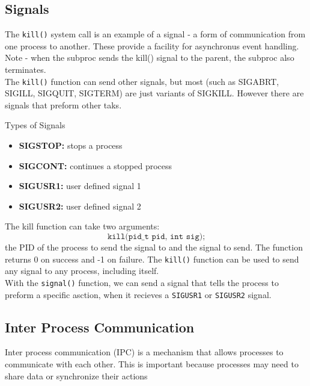 \documentclass[a4paper, 10pt]{article}
\begin{document}
\subsection{Signals}
The \texttt{kill()} system call is an example of a signal - a form of communication from one process to another. These provide a facility for asynchronus event handling. Note - when the subproc sends the kill() signal to the parent, the subproc also terminates. \\[2ex]
The \texttt{kill()} function can send other signals, but most (such as SIGABRT, SIGILL, SIGQUIT, SIGTERM) are just variants of SIGKILL. However there are signals that preform other taks.
\begin{conceptbox}{Types of Signals}{}
    \begin{itemize}
        \item \textbf{SIGSTOP:} stops a process
        \item \textbf{SIGCONT:} continues a stopped process
        \item \textbf{SIGUSR1:} user defined signal 1
        \item \textbf{SIGUSR2:}  user defined signal 2
    \end{itemize}
\end{conceptbox}
The kill function can take two arguments:
$$\texttt{kill(pid\_t pid, int sig);}$$
the PID of the process to send the signal to and the signal to send. The function returns 0 on success and -1 on failure. The \texttt{kill()} function can be used to send any signal to any process, including itself. \\
With the \texttt{signal()} function, we can send a signal that tells the process to preform a specific asction, when it recieves a \texttt{SIGUSR1} or \texttt{SIGUSR2} signal.

\pagebreak

\subsection{Inter Process Communication}
Inter process communication (IPC) is a mechanism that allows processes to communicate with each other. This is important because processes may need to share data or synchronize their actions
\end{document}
